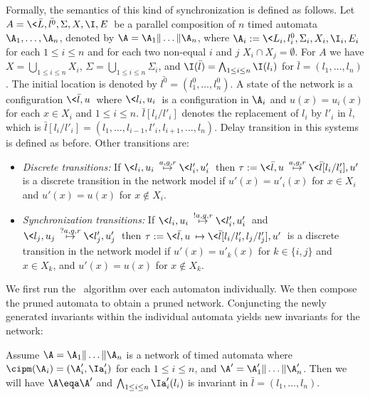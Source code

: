\documentclass{eptcs}
\begin{document}
Formally, the semantics of this kind of synchronization is defined as follows.
Let $A=\<\bar{L},\bar{l^0} ,\Sigma,X,\I,E\>$ be a parallel composition of $n$
timed automata $\A_1,\dots,\A_n$, denoted by $\A= \A_1\|\dots\|\A_n$, where
$\A_i:=\< L_i,l^0_i ,\Sigma_i,X_i,\I_i,E_i \>$ for each $1\leq i\leq n$ and
for each two non-equal $i$ and $j$ $X_i\cap X_j=\emptyset$.  For $A$ we have
$X=\bigcup_{1\leq i\leq n} X_i$, $\Sigma=\bigcup_{1\leq i\leq n} \Sigma_i$,
and $\I(\bar{l})= \bigwedge_{1\leq i\leq n} \I(l_i)$ for $\bar{l}= (l_1,\dots,
l_n)$. The initial location is denoted by $\bar{l^0}= (l^0_1,\dots, l^0_n)$.
A state of the network is a configuration $\<\bar{l}, u\>$ where
 $\<l_i,u_i\>$ is a configuration in $\A_i$ and $u(x)=u_i(x)$ for each $x\in X_i$ and $1\leq i\leq n$.
$\bar{l}[l_i/l'_i]$ denotes the replacement of $l_i$ by $l'_i$ in $\bar{l}$,
which is $\bar{l}[l_i/l'_i]=(l_1,\dots, l_{i-1},l'_i, l_{i+1},\dots,l_n)$.
Delay transition in this systems is defined as before. Other transitions are:
\begin{itemize}
\item {\em Discrete transitions:} If 
$\< l_i,u_i\> \stackrel{a,g,r}{\mapsto}\< l'_i,u'_i\>$ then $\tau:=\<\bar{l},
u\>\stackrel{a,g,r}{\mapsto}\<\bar{l}[l_i/l'_i], u'\>$ is a discrete
transition in the network model if $u'(x){=}u'_i(x)$ for $x{\in} X_i$ and
$u'(x){=}u(x)$ for $x\notin X_i$.
\item {\em Synchronization transitions:} If 
$\< l_i,u_i\> \stackrel{!a,g,r}{\mapsto}\< l'_i,u'_i\>$ and  $\< l_j,u_j\>
\stackrel{?a,g,r}{\mapsto}\< l'_j,u'_j\>$ 
then $\tau:=\<\bar{l},u\>\mapsto\<\bar{l}[l_i/l'_i,l_j/l'_j], u'\>$ is a discrete
transition in the network model if $u'(x)=u'_k(x)$ for $k\in\{i,j\}$ and $x\in X_k$, and
$u'(x)=u(x)$ for $x\notin X_k$.
\end{itemize}

We first run the \cipm\ algorithm over each automaton individually. We then compose the
pruned automata to obtain a pruned network. Conjuncting the newly generated
invariants within the individual automata yields new invariants for the network:
\begin{theorem}
\label{theo.parallel}
Assume $\A= \A_1\|\dots\|\A_n$ is a network of timed automata where
$\cipm(\A_i)=(\A'_i,\Ia'_i)$ for each $1\leq i\leq n$, and $\A'=
\A'_1\|\dots\|\A'_n$. Then we will have $\A\eqa\A'$ and $\bigwedge_{1\leq
i\leq n}\Ia'_i(l_i)$ is invariant in $\bar{l}=(l_1,\dots,l_n)$.
\end{theorem}
\end{document}
